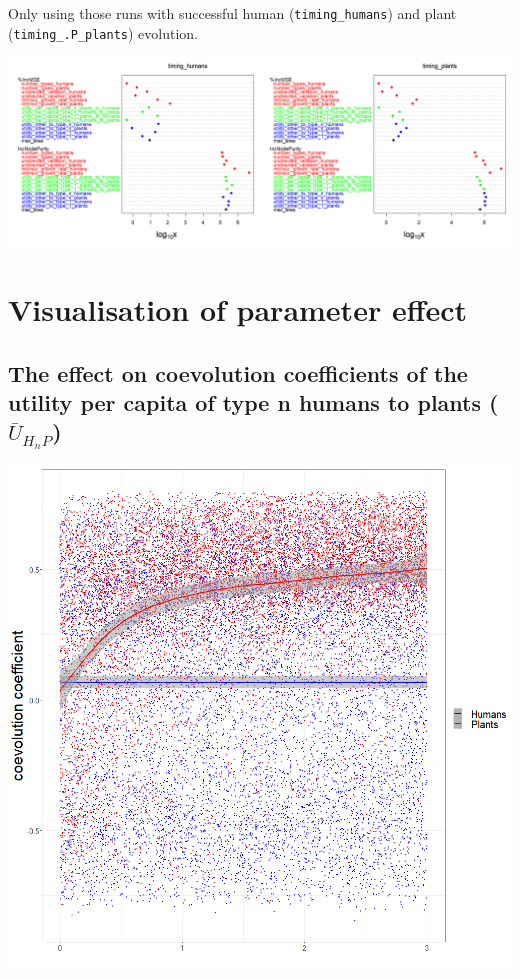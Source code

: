 \documentclass[
]{book}
\begin{document}
Only using those runs with successful human (\texttt{timing\_humans}) and plant (\texttt{timing\_.P\_plants}) evolution.

\includegraphics[width=1\linewidth]{plots/5_LHS_timing_variableImportancePlot}

\newpage

\hypertarget{visualisation-of-parameter-effect}{%
\section{Visualisation of parameter effect}\label{visualisation-of-parameter-effect}}

\hypertarget{the-effect-on-coevolution-coefficients-of-the-utility-per-capita-of-type-n-humans-to-plants-baru_h_np}{%
\subsection{\texorpdfstring{The effect on coevolution coefficients of the utility per capita of type n humans to plants (\(\bar{U}_{H_{n}P}\))}{The effect on coevolution coefficients of the utility per capita of type n humans to plants (\textbackslash bar\{U\}\_\{H\_\{n\}P\})}}\label{the-effect-on-coevolution-coefficients-of-the-utility-per-capita-of-type-n-humans-to-plants-baru_h_np}}


\includegraphics[width=1\linewidth]{plots/5_LHS_coevolution_coefficients_bifurcationPlot_twoVariables}
\end{document}
